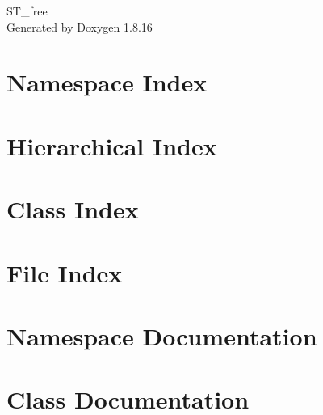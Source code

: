 \let\mypdfximage\pdfximage\def\pdfximage{\immediate\mypdfximage}\documentclass[twoside]{book}
\newcommand{\+}{\discretionary{\mbox{\scriptsize$\hookleftarrow$}}{}{}}
\newcommand{\clearemptydoublepage}{%
  \newpage{\pagestyle{empty}\cleardoublepage}%
}
\begin{document}
\hypersetup{pageanchor=false,
             bookmarksnumbered=true,
             pdfencoding=unicode
            }
\begin{titlepage}
\vspace*{7cm}
\begin{center}%
{\Large S\+T\+\_\+free }\\
\vspace*{1cm}
{\large Generated by Doxygen 1.8.16}\\
\end{center}
\end{titlepage}
\clearemptydoublepage
{}
\tableofcontents
\clearemptydoublepage
{}
\hypersetup{pageanchor=true}

\chapter{Namespace Index}

\chapter{Hierarchical Index}

\chapter{Class Index}

\chapter{File Index}

\chapter{Namespace Documentation}

\chapter{Class Documentation}



























\end{document}

